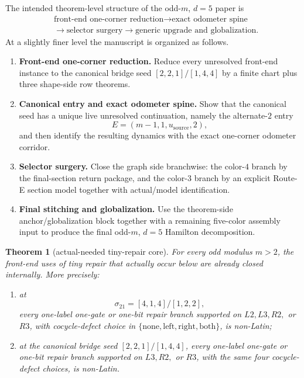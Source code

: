 \documentclass[11pt]{article}
\newtheorem{theorem}{Theorem}[section]
\newcommand{\sig}[2]{\sigma_{#1#2}}
\newcommand{\CanL}{[2,2,1]}
\newcommand{\CanR}{[1,4,4]}
\newcommand{\CanSeed}{\CanL/\CanR}
\begin{document}
The intended theorem-level structure of the odd-$m$, $d=5$ paper is
\[
\begin{aligned}
&\text{front-end one-corner reduction}
\to
\text{exact odometer spine}\\
&\to
\text{selector surgery}
\to
\text{generic upgrade and globalization}.
\end{aligned}
\]
At a slightly finer level the manuscript is organized as follows.
\begin{enumerate}[label=\textup{(\Roman*)},leftmargin=3.0em]
\item \textbf{Front-end one-corner reduction.}
      Reduce every unresolved front-end instance to the canonical bridge seed
      \(\CanSeed\) by a finite chart plus three shape-side row theorems.
\item \textbf{Canonical entry and exact odometer spine.}
      Show that the canonical seed has a unique live unresolved continuation,
      namely the alternate-$2$ entry
      \[
      E=(m-1,1,u_{\mathrm{source}},2),
      \]
      and then identify the resulting dynamics with the exact one-corner
      odometer corridor.
\item \textbf{Selector surgery.}
      Close the graph side branchwise: the color-$4$ branch by the final-section
      return package, and the color-$3$ branch by an explicit Route-E section
      model together with actual/model identification.
\item \textbf{Final stitching and globalization.}
      Use the theorem-side anchor/globalization block together with a remaining
      five-color assembly input to produce the final odd-$m$, $d=5$ Hamilton
      decomposition.
\end{enumerate}

\begin{theorem}[actual-needed tiny-repair core]
\label{thm:T0-needed}
For every odd modulus $m>2$, the front-end uses of tiny repair that actually
occur below are already closed internally.
More precisely:
\begin{enumerate}[label=\textup{(\arabic*)},leftmargin=2.8em]
\item at
      \[
      \sig21=[4,1,4]/[1,2,2],
      \]
      every one-label one-gate or one-bit repair branch supported on
      \(L2,L3,R2,\) or \(R3\), with cocycle-defect choice in
      \(\{\mathrm{none},\mathrm{left},\mathrm{right},\mathrm{both}\}\),
      is non-Latin;
\item at the canonical bridge seed \(\CanSeed\), every one-label one-gate or
      one-bit repair branch supported on \(L3,R2,\) or \(R3\), with the same
      four cocycle-defect choices, is non-Latin.
\end{enumerate}
\end{theorem}
\end{document}
